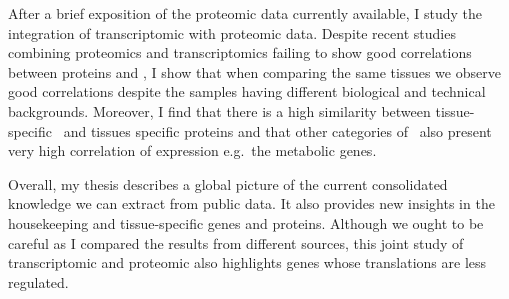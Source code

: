 \begin{singlespace}
{        After a brief exposition of the proteomic data currently available, I
        study the integration of transcriptomic with proteomic data. Despite
        recent studies combining proteomics and transcriptomics failing to show
        good correlations between proteins and \mRNAs, I show that when comparing
        the same tissues we observe good correlations despite the samples having
        different biological and technical backgrounds. Moreover, I find that
        there is a high similarity between tissue-specific \mRNAs\ and tissues
        specific proteins and that other categories of \mRNAs\ also present very
        high correlation of expression e.g.\ the metabolic genes.

        Overall, my thesis describes a global picture of the current consolidated
        knowledge we can extract from public data. It also provides new insights
        in the housekeeping and tissue-specific genes and proteins. Although we
        ought to be careful as I compared the results from different sources,
        this joint study of transcriptomic and proteomic also highlights genes
        whose translations are less regulated.
    } %
\end{singlespace}
